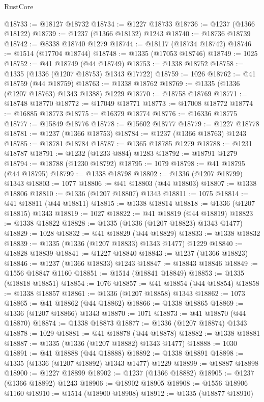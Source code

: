 \begin{lexlean}{RustCore}
\begin{coremodule}
@18733 := @18127 @18732
@18734 := @1227 @18733
@18736 := @1237 (@1366 @18122)
@18739 := @1237 (@1366 @18132) @1243
@18740 := @18736 @18739
@18742 := @8338 @18740 @1279
@18744 := @18117 (@18734 @18742)
@18746 := @1514 (@17704 @18744)
@18748 := @1335 (@17053 @18746)
@18749 := 1025
@18752 := @41 @18749 (@44 @18749)
@18753 := @1338 @18752
@18758 := @1335 (@1336 (@1207 @18753) @1343 @17722)
@18759 := 1026
@18762 := @41 @18759 (@44 @18759)
@18763 := @1338 @18762
@18769 := @1335 (@1336 (@1207 @18763) @1343 @1388) @1229
@18770 := @18758 @18769
@18771 := @18748 @18770
@18772 := @17049 @18771
@18773 := @17008 @18772
@18774 := @16885 @18773
@18775 := @16379 @18774
@18776 := @16336 @18775
@18777 := @15849 @18776
@18778 := @15602 @18777
@18779 := @1227 @18778
@18781 := @1237 (@1366 @18753)
@18784 := @1237 (@1366 @18763) @1243
@18785 := @18781 @18784
@18787 := @1365 @18785 @1279
@18788 := @1231 @18787
@18791 := @1232 (@1233 @884) @1283
@18792 := @18791 @1279
@18794 := @18788 (@1230 @18792)
@18795 := 1079
@18798 := @41 @18795 (@44 @18795)
@18799 := @1338 @18798
@18802 := @1336 (@1207 @18799) @1343
@18803 := 1077
@18806 := @41 @18803 (@44 @18803)
@18807 := @1338 @18806
@18810 := @1336 (@1207 @18807) @1343
@18811 := 1075
@18814 := @41 @18811 (@44 @18811)
@18815 := @1338 @18814
@18818 := @1336 (@1207 @18815) @1343
@18819 := 1027
@18822 := @41 @18819 (@44 @18819)
@18823 := @1338 @18822
@18828 := @1335 (@1336 (@1207 @18823) @1343 @1477)
@18829 := 1028
@18832 := @41 @18829 (@44 @18829)
@18833 := @1338 @18832
@18839 := @1335 (@1336 (@1207 @18833) @1343 @1477) @1229
@18840 := @18828 @18839
@18841 := @1227 @18840
@18843 := @1237 (@1366 @18823)
@18846 := @1237 (@1366 @18833) @1243
@18847 := @18843 @18846
@18849 := @1556 @18847 @1160
@18851 := @1514 (@18841 @18849)
@18853 := @1335 (@18818 @18851)
@18854 := 1076
@18857 := @41 @18854 (@44 @18854)
@18858 := @1338 @18857
@18861 := @1336 (@1207 @18858) @1343
@18862 := 1073
@18865 := @41 @18862 (@44 @18862)
@18866 := @1338 @18865
@18869 := @1336 (@1207 @18866) @1343
@18870 := 1071
@18873 := @41 @18870 (@44 @18870)
@18874 := @1338 @18873
@18877 := @1336 (@1207 @18874) @1343
@18878 := 1029
@18881 := @41 @18878 (@44 @18878)
@18882 := @1338 @18881
@18887 := @1335 (@1336 (@1207 @18882) @1343 @1477)
@18888 := 1030
@18891 := @41 @18888 (@44 @18888)
@18892 := @1338 @18891
@18898 := @1335 (@1336 (@1207 @18892) @1343 @1477) @1229
@18899 := @18887 @18898
@18900 := @1227 @18899
@18902 := @1237 (@1366 @18882)
@18905 := @1237 (@1366 @18892) @1243
@18906 := @18902 @18905
@18908 := @1556 @18906 @1160
@18910 := @1514 (@18900 @18908)
@18912 := @1335 (@18877 @18910)

\end{coremodule}
\end{lexlean}
